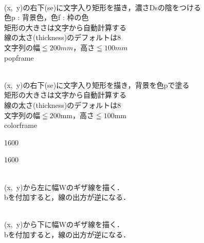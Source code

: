 \documentclass[a4j]{jarticle}
\begin{document}
\newpage

\\
\tab{}(x,\ y)の右下(se)に文字入り矩形を描き，濃さDsの陰をつける\\
\chuu 色p : 背景色，色f : 枠の色\\
\chuu 矩形の大きさは文字から自動計算する\\
\chuu 線の太さ(thickness)のデフォルトは8\\
\chuu 文字列の幅$\leqq 200mm$，高さ$\leqq 100mm$\\
\rei \bs popframe

\\
\tab{}(x,\ y)の右下(se)に文字入り矩形を描き，背景を色pで塗る\\
\chuu 矩形の大きさは文字から自動計算する\\
\chuu 線の太さ(thickness)のデフォルトは8\\
\chuu 文字列の幅$\leqq 200$mm，高さ$\leqq 100$mm\\
\rei \bs colorframe

\begin{layer}{160}{0}
\end{layer}

\vspace{15mm}

\begin{layer}{160}{0}



\end{layer}


\\
\tab{}(x,\ y)から左に幅Wのギザ線を描く．\\
\chuu bを付加すると，線の出方が逆になる．

\\
\tab{}(x,\ y)から下に幅Wのギザ線を描く．\\
\chuu bを付加すると，線の出方が逆になる．
\end{document}
